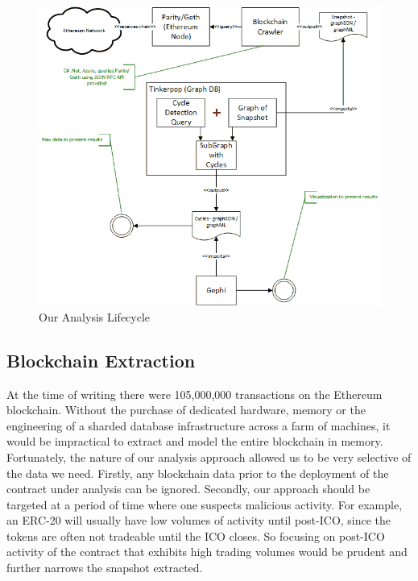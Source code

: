 \documentclass[conference]{IEEEtran}
\begin{document}
\begin{figure}
    \centering
    \includegraphics[width=0.8\columnwidth]{images/graph_analysis_lifecycle.png}
    \caption{Our Analysis Lifecycle}
    \label{fig:lifecycle}
\end{figure}

\subsection{Blockchain Extraction} \label{extraction}
At the time of writing there were 105,000,000 transactions on the Ethereum blockchain.  Without the purchase of dedicated hardware,  memory or the engineering of a sharded database infrastructure across a farm of machines,  it would be impractical to extract and model the entire blockchain in memory.  Fortunately,  the nature of our analysis approach allowed us to be very selective of the data we need.  Firstly, any blockchain data prior to the deployment of the contract under analysis can be ignored. Secondly, our approach should be targeted at a period of time where one suspects malicious activity.  For example,  an ERC-20 will usually have low volumes of activity until post-ICO, since the tokens are often not tradeable until the ICO closes. So focusing on post-ICO activity of the contract that exhibits high trading volumes would be prudent and further narrows the snapshot extracted.
\end{document}

